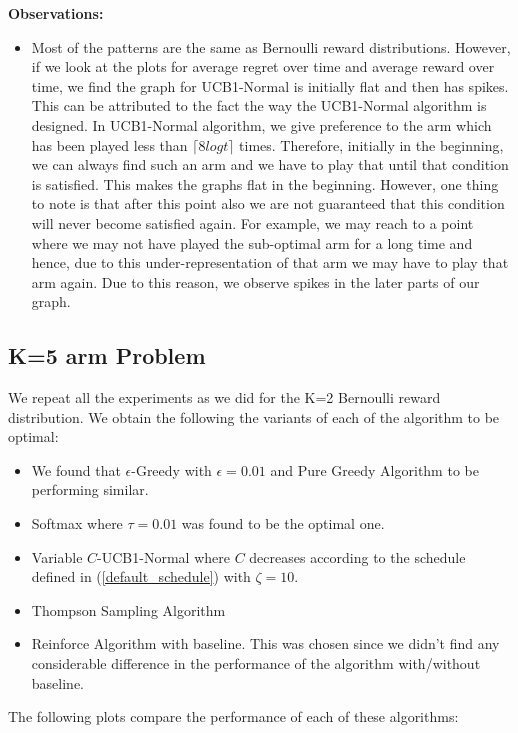 \documentclass{article}
\begin{document}
		\textbf{Observations:}
		\begin{itemize}
			\item Most of the patterns are the same as Bernoulli reward distributions. However, if we look at the plots for average regret over time and average 
			reward over time, we find the graph for UCB1-Normal is initially flat and then has spikes. This can be attributed to the fact the way the UCB1-Normal
			algorithm is designed. In UCB1-Normal algorithm, we give preference to the arm which has been played less than $\lceil 8 log t \rceil$ times. Therefore,
			initially in the beginning, we can always find such an arm and we have to play that until that condition is satisfied. This makes the graphs flat in 
			the beginning. However, one thing to note is that after this point also we are not guaranteed that this condition will never become satisfied again. For
			example, we may reach to a point where we may not have played the sub-optimal arm for a long time and hence, due to this under-representation of that arm
			we may have to play that arm again. Due to this reason, we observe spikes in the later parts of our graph.
		\end{itemize}
		
	\subsection{K=5 arm Problem}
		We repeat all the experiments as we did for the K=2 Bernoulli reward distribution. We obtain the following the variants of each of the algorithm to be optimal:
		\begin{itemize}
			\item We found that $\epsilon$-Greedy with $\epsilon=0.01$ and Pure Greedy Algorithm to be performing similar.
			\item Softmax where $\tau=0.01$ was found to be the optimal one.
			\item Variable $C$-UCB1-Normal where $C$ decreases according to the schedule defined in (\ref{default_schedule}) with $\zeta=10$.
			\item Thompson Sampling Algorithm
			\item Reinforce Algorithm with baseline. This was chosen since we didn't find any considerable difference in the performance of the algorithm with/without
				baseline.
		\end{itemize}
		
		The following plots compare the performance of each of these algorithms:
		
\end{document}
